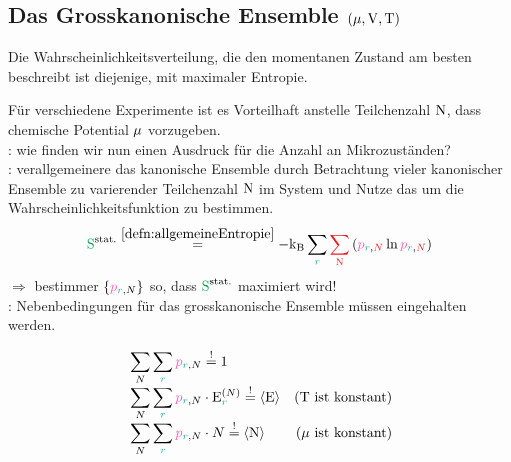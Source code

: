 \subsection{Das Grosskanonische Ensemble $(\mathrm{\mu},\mathrm{V},\mathrm{T})$}
\label{subsec:DasGrosskanonischeEnsemble}
\begin{principbox}
  \begin{princip}
    Die Wahrscheinlichkeitsverteilung, die den momentanen Zustand am
    besten beschreibt ist diejenige, mit maximaler Entropie.
  \end{princip}
\end{principbox}
\begin{sectionbox}[Problem]\nospacing
  \begin{wrapfigure}{r}{0.55\linewidth}	
  \end{wrapfigure}
 Für verschiedene Experimente ist es Vorteilhaft anstelle Teilchenzahl
 $\mathrm{N}$, dass chemische Potential $\mathrm{\mu}$ vorzugeben.\\
 : wie finden wir nun einen Ausdruck für die Anzahl an Mikrozuständen?\\
 : verallgemeinere das kanonische Ensemble durch Betrachtung
 vieler kanonischer Ensemble zu varierender Teilchenzahl $\mathrm{N}$ im System und Nutze das  um die
 Wahrscheinlichkeitsfunktion zu bestimmen.
 \begin{equation*}
   \Spots\eqs{\cref{defn:allgemeineEntropie}}-\kb\sum_{\idxr}\rd{\sum_{\Nz}}\left(\pb_{\idxr,\rd{N}}\ln\pb_{\idxr,\rd{N}}\right)
 \end{equation*}
 $\Rightarrow$ bestimmer $\{\pbrN\}$ so, dass $\Spots$ maximiert wird!\\
 : Nebenbedingungen für das grosskanonische Ensemble müssen eingehalten werden.
\end{sectionbox}
\begin{sectionbox}[Nebenbedingungen]\nospacing
  \begin{align*}
    &\sum_{N}\sum_{\idxr}\pbrN\eqs{!}1\nalign
    &\sum_{N}\sum_{\idxr}\pbrN\cdot\Ezr^{(N)}\eqs{!}\obs{\Ez}&(\Tz \text{ ist konstant})\nalign
    &\sum_{N}\sum_{\idxr}\pbrN\cdot N\eqs{!}\obs{\Nz}&(\muz \text{ ist konstant})
  \end{align*}
\end{sectionbox}
